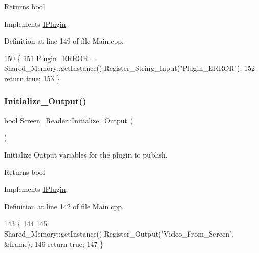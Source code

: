 \begin{DoxyReturn}{Returns}
bool 
\end{DoxyReturn}


Implements \hyperlink{class_i_plugin_aa7c66743ad956d8ada57becee559af4d}{I\+Plugin}.



Definition at line 149 of file Main.\+cpp.


\begin{DoxyCode}
150 \{
151     Plugin\_ERROR = Shared\_Memory::getInstance().Register\_String\_Input(\textcolor{stringliteral}{"Plugin\_ERROR"});
152     \textcolor{keywordflow}{return} \textcolor{keyword}{true};
153 \}
\end{DoxyCode}
\mbox{\label{class_screen___reader_ab6219f6991a1574fb20b5f96953da62e}} 
\subsubsection{\texorpdfstring{Initialize\+\_\+\+Output()}{Initialize\_Output()}}
{\footnotesize\ttfamily bool Screen\+\_\+\+Reader\+::\+Initialize\+\_\+\+Output (\begin{DoxyParamCaption}{ }\end{DoxyParamCaption})\hspace{0.3cm}{\ttfamily [virtual]}}



Initialize Output variables for the plugin to publish. 

\begin{DoxyReturn}{Returns}
bool 
\end{DoxyReturn}


Implements \hyperlink{class_i_plugin_a0b772513fc8c4ed01240e19c4bb84068}{I\+Plugin}.



Definition at line 142 of file Main.\+cpp.


\begin{DoxyCode}
143 \{   
144     
145     Shared\_Memory::getInstance().Register\_Output(\textcolor{stringliteral}{"Video\_From\_Screen"}, &frame);
146     \textcolor{keywordflow}{return} \textcolor{keyword}{true};
147 \}
\end{DoxyCode}
\mbox{\label{class_screen___reader_aaae80932d8f6af903ca93846eb4de234}} 
